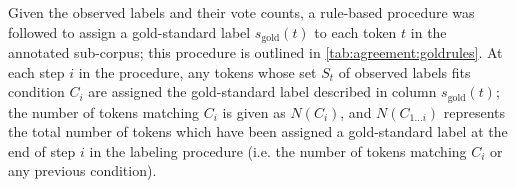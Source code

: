 		Given the observed labels and their vote counts, a rule-based procedure was followed to assign a gold-standard label $s_{\text{gold}}(t)$ to each token $t$ in the annotated sub-corpus; this procedure is outlined in \cref{tab:agreement:goldrules}. At each step $i$ in the procedure, any tokens whose set $S_t$ of observed labels fits condition $C_i$ are assigned the gold-standard label described in column $s_{\text{gold}}(t)$; the number of tokens matching $C_i$ is given as $N(C_i)$, and 
		$N(C_{1 \dots i})$ represents the total number of tokens which have been assigned a gold-standard label at the end of step $i$ in the labeling procedure (i.e. the number of tokens matching $C_i$ or any previous condition).
		
		

